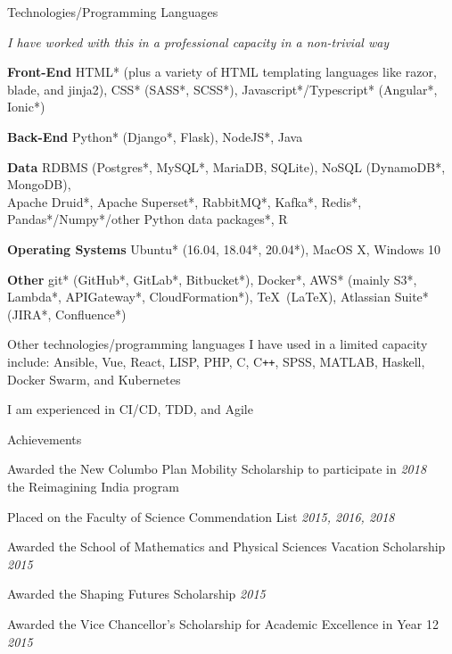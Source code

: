 \documentclass{resume} %
\begin{document}

\begin{rSection}{Technologies/Programming Languages}
    \item {\em * I have worked with this in a professional capacity in a non-trivial way}
    \item {\bf Front-End} HTML* (plus a variety of HTML templating languages like razor,
    blade, and jinja2), CSS* (SASS*, SCSS*), Javascript*/Typescript* (Angular*, Ionic*)
    \item {\bf Back-End} Python* (Django*, Flask), NodeJS*, Java
    \item {\bf Data} RDBMS (Postgres*, MySQL*, MariaDB, SQLite), NoSQL (DynamoDB*, MongoDB),
    \\ Apache Druid*, Apache Superset*, RabbitMQ*, Kafka*, Redis*, Pandas*/Numpy*/other Python data packages*, R
    \item {\bf Operating Systems} Ubuntu* (16.04, 18.04*, 20.04*), MacOS X, Windows 10
    \item {\bf Other} git* (GitHub*, GitLab*, Bitbucket*), Docker*, AWS* (mainly S3*, Lambda*, APIGateway*, CloudFormation*), \TeX\ (\LaTeX),
    Atlassian Suite* (JIRA*, Confluence*)
    \item Other technologies/programming languages I have used in a limited capacity include:
    Ansible, Vue, React, LISP, PHP, C, C\texttt{++}, SPSS, MATLAB, Haskell, Docker Swarm, and Kubernetes
    \item I am experienced in CI/CD, TDD, and Agile
\end{rSection}


\begin{rSection}{Achievements}
    \item Awarded the New Columbo Plan Mobility Scholarship to participate in \hfill {\em 2018}
    \\ the Reimagining India program
    \item Placed on the Faculty of Science Commendation List \hfill {\em 2015, 2016, 2018}
    \item Awarded the School of Mathematics and Physical Sciences Vacation Scholarship
    \hfill {\em 2015}
    \item Awarded the Shaping Futures Scholarship \hfill {\em 2015} \
    \item Awarded the Vice Chancellor's Scholarship for Academic Excellence in Year 12 \hfill {\em 2015}
\end{rSection}
\end{document}
